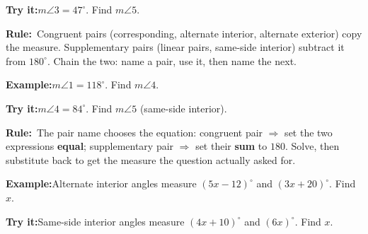 \documentclass[12pt]{article}
\begin{document}
\begin{tryitbox}\textbf{Try it:}\quad $m\angle 3 = 47^\circ$. Find $m\angle 5$.
\ \end{tryitbox}


\begin{formulabox}\textbf{Rule:}\ Congruent pairs (corresponding, alternate
interior, alternate exterior) copy the measure. Supplementary pairs (linear
pairs, same-side interior) subtract it from $180^\circ$. Chain the two: name a
pair, use it, then name the next.
\end{formulabox}

\begin{examplebox}\textbf{Example:}\quad $m\angle 1 = 118^\circ$. Find
$m\angle 4$.
\end{examplebox}

\begin{tryitbox}\textbf{Try it:}\quad $m\angle 4 = 84^\circ$. Find $m\angle 5$
(same-side interior).
\ \end{tryitbox}


\begin{formulabox}\textbf{Rule:}\ The pair name chooses the equation:
congruent pair $\Rightarrow$ set the two expressions \textbf{equal};
supplementary pair $\Rightarrow$ set their \textbf{sum} to $180$. Solve, then
substitute back to get the measure the question actually asked for.
\end{formulabox}

\begin{examplebox}\textbf{Example:}\quad Alternate interior angles measure
$(5x - 12)^\circ$ and $(3x + 20)^\circ$. Find $x$.
\end{examplebox}

\begin{tryitbox}\textbf{Try it:}\quad Same-side interior angles measure
$(4x + 10)^\circ$ and $(6x)^\circ$. Find $x$.
\ \end{tryitbox}
\end{document}
